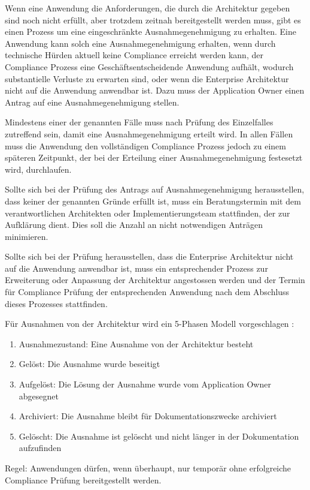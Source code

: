 Wenn eine Anwendung die Anforderungen, die durch die Architektur gegeben sind noch nicht erfüllt, aber trotzdem zeitnah bereitgestellt werden muss, gibt es einen Prozess um eine eingeschränkte Ausnahmegenehmigung zu erhalten. Eine Anwendung kann solch eine Ausnahmegenehmigung erhalten, wenn durch technische Hürden aktuell keine Compliance erreicht werden kann, der Compliance Prozess eine Geschäftsentscheidende Anwendung aufhält, wodurch substantielle Verluste zu erwarten sind, oder wenn die Enterprise Architektur nicht auf die Anwendung anwendbar ist. Dazu muss der Application Owner einen Antrag auf eine Ausnahmegenehmigung stellen. 

Mindestens einer der genannten Fälle muss nach Prüfung des Einzelfalles zutreffend sein, damit eine Ausnahmegenehmigung erteilt wird. In allen Fällen muss die Anwendung den vollständigen Compliance Prozess jedoch zu einem späteren Zeitpunkt, der bei der Erteilung einer Ausnahmegenehmigung festesetzt wird, durchlaufen. 

Sollte sich bei der Prüfung des Antrags auf Ausnahmegenehmigung herausstellen, dass keiner der genannten Gründe erfüllt ist, muss ein Beratungstermin mit dem verantwortlichen Architekten oder Implementierungsteam stattfinden, der zur Aufklärung dient. Dies soll die Anzahl an nicht notwendigen Anträgen minimieren. 

Sollte sich bei der Prüfung herausstellen, dass die Enterprise Architektur nicht auf die Anwendung anwendbar ist, muss ein entsprechender Prozess zur Erweiterung oder Anpassung der Architektur angestossen werden und der Termin für Compliance Prüfung der entsprechenden Anwendung nach dem Abschluss dieses Prozesses stattfinden.

Für Ausnahmen von der Architektur wird ein 5-Phasen Modell vorgeschlagen \cite{exception-governance}:

\begin{enumerate}
\item Ausnahmezustand: Eine Ausnahme von der Architektur besteht
\item Gelöst: Die Ausnahme wurde beseitigt
\item Aufgelöst: Die Lösung der Ausnahme wurde vom Application Owner abgesegnet
\item Archiviert: Die Ausnahme bleibt für Dokumentationszwecke archiviert
\item Gelöscht: Die Ausnahme ist gelöscht und nicht länger in der Dokumentation aufzufinden
\end{enumerate}

Regel: Anwendungen dürfen, wenn überhaupt, nur temporär ohne erfolgreiche Compliance Prüfung bereitgestellt werden.
